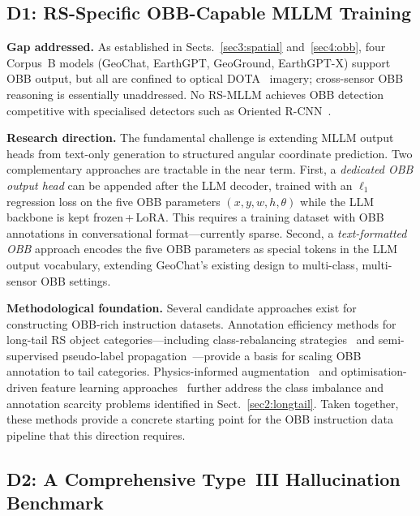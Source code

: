 \subsection{D1: RS-Specific OBB-Capable MLLM Training}\label{sec9:d1}

\textbf{Gap addressed.} As established in Sects.~\ref{sec3:spatial}
and~\ref{sec4:obb}, four Corpus~B models (GeoChat, EarthGPT, GeoGround, EarthGPT-X)
support OBB output, but all are confined to optical DOTA~\cite{xia2018dota}
imagery; cross-sensor OBB reasoning is essentially unaddressed.
No RS-MLLM achieves OBB detection competitive with specialised detectors
such as Oriented R-CNN~\cite{xie2021orientedrcnn}.

\textbf{Research direction.} The fundamental challenge is extending MLLM
output heads from text-only generation to structured angular coordinate
prediction. Two complementary approaches are tractable in the near term.
First, a \emph{dedicated OBB output head} can be appended after the LLM
decoder, trained with an $\ell_1$ regression loss on the five OBB
parameters $(x, y, w, h, \theta)$ while the LLM backbone is kept
frozen\,+\,LoRA. This requires a training dataset with OBB annotations
in conversational format---currently sparse. Second, a
\emph{text-formatted OBB} approach encodes the five OBB parameters as
special tokens in the LLM output vocabulary, extending GeoChat's existing
design to multi-class, multi-sensor OBB settings.

\textbf{Methodological foundation.} Several candidate approaches exist for
constructing OBB-rich instruction datasets. Annotation efficiency methods
for long-tail RS object categories---including class-rebalancing
strategies~\cite{ding2021object} and semi-supervised pseudo-label
propagation~\cite{sm2lf2026}---provide a basis for scaling OBB annotation
to tail categories. Physics-informed augmentation~\cite{dsc_aug2025} and
optimisation-driven feature learning approaches~\cite{odfe2025} further
address the class imbalance and annotation scarcity problems identified
in Sect.~\ref{sec2:longtail}. Taken together, these methods provide
a concrete starting point for the OBB instruction data pipeline that
this direction requires.

\subsection{D2: A Comprehensive Type~III Hallucination Benchmark}\label{sec9:d2}

